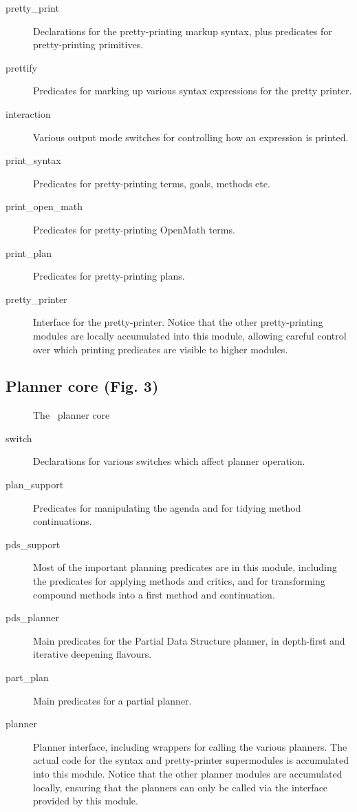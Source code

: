 \begin{description}
  
\item[pretty\_print] Declarations for the pretty-printing markup
  syntax, plus predicates for pretty-printing primitives.
\item[prettify] Predicates for marking up various syntax expressions for the pretty printer.
\item[interaction] Various output mode switches for controlling how an expression is printed.
\item[print\_syntax] Predicates for pretty-printing terms, goals, methods etc.
\item[print\_open\_math] Predicates for pretty-printing OpenMath terms.
\item[print\_plan] Predicates for pretty-printing plans.
\item[pretty\_printer] Interface for the pretty-printer.  Notice that
  the other pretty-printing modules are locally accumulated into this
  module, allowing careful control over which printing predicates are
  visible to higher modules.
\end{description}

\subsection{Planner core (Fig. 3)}

\begin{figure}
\begin{center}
\end{center}
\caption{The \lclam\ planner core}
\end{figure}

\begin{description}

\item[switch] Declarations for various switches which affect planner operation.
\item[plan\_support] Predicates for manipulating the agenda and for
  tidying method continuations.
\item[pds\_support] Most of the important planning predicates are in
  this module, including the predicates for applying methods and
  critics, and for transforming compound methods into a first method
  and continuation.
\item[pds\_planner] Main predicates for the Partial Data Structure planner, in depth-first and iterative deepening flavours.
\item[part\_plan] Main predicates for a partial planner.
\item[planner] Planner interface, including wrappers for calling the
  various planners.  The actual code for the syntax and pretty-printer
  supermodules is accumulated into this module.  Notice that the other
  planner modules are accumulated locally, ensuring that the planners
  can only be called via the interface provided by this module.
\end{description}

